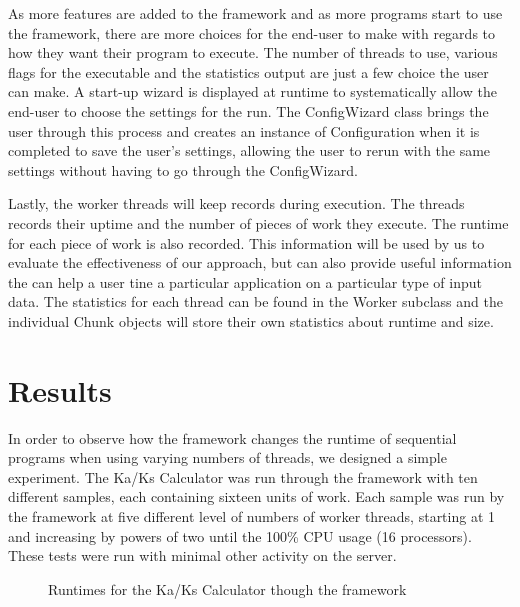 \documentclass[12pt]{article}
\begin{document}
As more features are added to the framework and as more programs start to use 
the framework, there are more choices for the end-user to make with regards to 
how they want their program to execute. The number of threads to use, various 
flags for the executable and the statistics output are just a few choice the 
user can make. A start-up wizard is displayed at runtime to systematically allow
the end-user to choose the settings for the run. The ConfigWizard class brings 
the user through this process and creates an instance of Configuration when it 
is completed to save the user's settings, allowing the user to rerun with the
same settings without having to go through the ConfigWizard.

Lastly, the worker threads will keep records during execution. The threads 
records their uptime and the number of pieces of work they execute. The runtime 
for each piece of work is also recorded. This information will be used by us to
evaluate the effectiveness of our approach, but can also provide useful
information the can help a user tine a particular application on a particular
type of input data. The statistics for each thread can be found in the Worker 
subclass and the individual Chunk objects will store their own statistics about 
runtime and size.

\section{Results}

In order to observe how the framework changes the runtime of sequential programs 
when using varying numbers of threads, we designed a simple experiment. The 
Ka/Ks Calculator was run through the framework with ten different samples, each 
containing sixteen units of work. Each sample was run by the framework at five 
different level of numbers of worker threads, starting at 1 and increasing by 
powers of two until the 100\% CPU usage (16 processors). These tests were run
with minimal other activity on the server.

\begin{figure}
{}
\caption{Runtimes for the Ka/Ks Calculator though the framework}
\label{fig:graph}
\end{figure}
\end{document}
